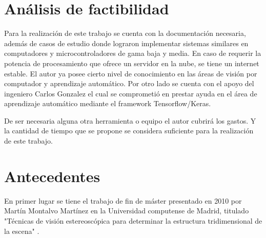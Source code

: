 \section{Análisis de factibilidad}
Para la realización de este trabajo se cuenta con la documentación necesaria, además de casos de estudio donde lograron implementar sistemas similares en computadores y microcontroladores de gama baja y media. En caso de requerir la potencia de procesamiento que ofrece un servidor en la nube, se tiene un internet estable. El autor ya posee cierto nivel de conocimiento en las áreas de visión por computador y aprendizaje automático. Por otro lado se cuenta con el apoyo del ingeniero Carlos Gonzalez el cual se comprometió en prestar ayuda en el área de aprendizaje automático mediante el framework Tensorflow/Keras.

De ser necesaria alguna otra herramienta o equipo el autor cubrirá los gastos. Y la cantidad de tiempo que se propone se considera suficiente para la realización de este trabajo.
\section{Antecedentes}
En primer lugar se tiene el trabajo de fin de máster presentado en 2010 por
Martín Montalvo Martínez en la Universidad computense de Madrid, titulado "Técnicas de visión estereoscópica para determinar la estructura tridimensional de la escena"  \cite{MartinMM}.

